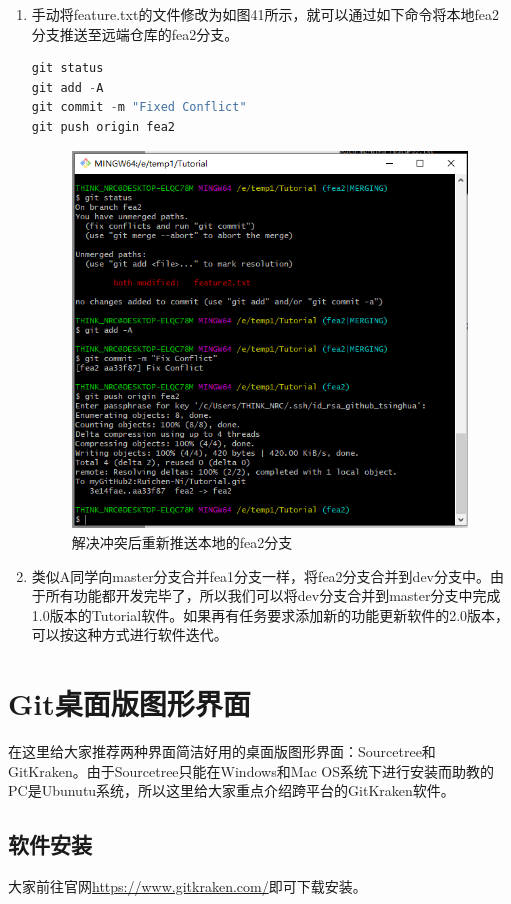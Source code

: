 \documentclass[a4paper,14pt]{article}
\begin{document}
\begin{enumerate}[1. ]
\newpage
\item 手动将feature.txt的文件修改为如图41所示，就可以通过如下命令将本地fea2分支推送至远端仓库的fea2分支。
{\color{red}
\begin{lstlisting}[language=C]
git status
git add -A
git commit -m "Fixed Conflict"
git push origin fea2
\end{lstlisting}
}
\begin{figure}[h]
\centering
\includegraphics[height=10cm]{figure/stepB14}
\caption{解决冲突后重新推送本地的fea2分支}
\end{figure}

\item 类似A同学向master分支合并fea1分支一样，将fea2分支合并到dev分支中。由于所有功能都开发完毕了，所以我们可以将dev分支合并到master分支中完成1.0版本的Tutorial软件。如果再有任务要求添加新的功能更新软件的2.0版本，可以按这种方式进行软件迭代。
\end{enumerate}

\section{Git桌面版图形界面}
在这里给大家推荐两种界面简洁好用的桌面版图形界面：Sourcetree和GitKraken。由于Sourcetree只能在Windows和Mac OS系统下进行安装而助教的PC是Ubunutu系统，所以这里给大家重点介绍跨平台的GitKraken软件。

\subsection*{软件安装}
大家前往官网\url{https://www.gitkraken.com/}即可下载安装。
\end{document}
